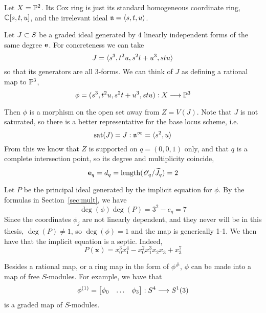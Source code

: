 \documentclass[fleqn,reqno]{amsart}
\begin{document}
\begin{example}[$\mt{ex202}$]
\label{ex202}
Let $X=\mathbb{P}^2$. Its Cox ring is just its standard homogeneous coordinate ring, $\mathbb{C}[s,t,u]$,
and the irrelevant ideal $\mathfrak{n}=\langle s,t,u\rangle$.

Let $J\subset S$ be a graded ideal generated by $4$ linearly independent forms of the same degree $\mathbf e$.
For concreteness we can take
\[
	J=\langle s^3,t^2u,s^2t+u^3,stu\rangle
\]
so that its generators are all $3$-forms.
We can think of $J$ as defining a rational map to $\mathbb{P}^3$,
\[
	\phi=(s^3,t^2u,s^2t+u^3,stu):X\longrightarrow\mathbb{P}^3
\]

Then $\phi$ is a morphism on the open set away from $Z=V(J)$.
Note that $J$ is not saturated, so there is a better representative for the base locus scheme,
i.e.
\[
\operatorname{sat}(J)=J:\mathfrak{n}^\infty=\langle s^2,u\rangle
\]
From this we know that $Z$ is supported on $q=(0,0,1)$ only,
and that $q$ is a complete intersection point, so its degree and multiplicity coincide,
\[
	\mathbf e_q=d_q=\operatorname{length}(\mathscr{O}_q/\widetilde{J}_q)=2
\]

Let $P$ be the principal ideal generated by the implicit equation for $\phi$.
By the formulas in Section~\ref{sec:mult}, we have
\[
	\deg(\phi)\deg(P)=3^2-e_q=7
\]
Since the coordinates $\phi_j$ are not linearly dependent,
and they never will be in this thesis,
$\deg(P)\neq1$, so $\deg(\phi)=1$ and the map is generically 1-1.
We then have that the implicit equation is a septic.
Indeed,
\[
	P(\mathbf x)={x}_{0}^{3} {x}_{1}^{4}-{x}_{0}^{2} {x}_{1}^{3} {x}_{2} {x}_{3}+{x}_{3}^{7}
\]

Besides a rational map, or a ring map in the form of $\phi^\#$,
$\phi$ can be made into a map of free $S$-modules.
For example, we have that
\[
	\phi^{(1)}=\begin{bmatrix}\phi_0&\ldots&\phi_3\end{bmatrix}:S^4\longrightarrow S^1(3)
\]
is a graded map of $S$-modules.


\end{example}
\end{document}
